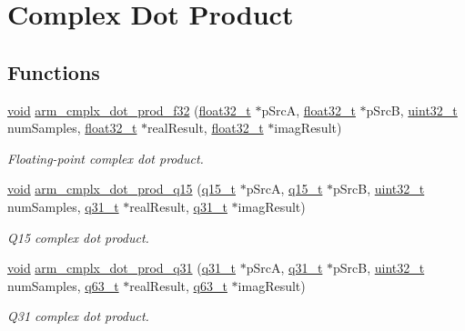 \hypertarget{group__cmplx__dot__prod}{\section{Complex Dot Product}
\label{group__cmplx__dot__prod}
}
\subsection*{Functions}
\begin{DoxyCompactItemize}
\item 
\hyperlink{group___n_a_m_e_ga18028b8badbf1ea7e704ccac3c488e82}{void} \hyperlink{group__cmplx__dot__prod_gadcfaf567a25eb641da4043eafb9bb076}{arm\-\_\-cmplx\-\_\-dot\-\_\-prod\-\_\-f32} (\hyperlink{arm__math_8h_a4611b605e45ab401f02cab15c5e38715}{float32\-\_\-t} $\ast$p\-Src\-A, \hyperlink{arm__math_8h_a4611b605e45ab401f02cab15c5e38715}{float32\-\_\-t} $\ast$p\-Src\-B, \hyperlink{stdint_8h_a435d1572bf3f880d55459d9805097f62}{uint32\-\_\-t} num\-Samples, \hyperlink{arm__math_8h_a4611b605e45ab401f02cab15c5e38715}{float32\-\_\-t} $\ast$real\-Result, \hyperlink{arm__math_8h_a4611b605e45ab401f02cab15c5e38715}{float32\-\_\-t} $\ast$imag\-Result)
\begin{DoxyCompactList}\small\item\em Floating-\/point complex dot product. \end{DoxyCompactList}\item 
\hyperlink{group___n_a_m_e_ga18028b8badbf1ea7e704ccac3c488e82}{void} \hyperlink{group__cmplx__dot__prod_ga2b08b5e8001d2c15204639d00893fc70}{arm\-\_\-cmplx\-\_\-dot\-\_\-prod\-\_\-q15} (\hyperlink{arm__math_8h_ab5a8fb21a5b3b983d5f54f31614052ea}{q15\-\_\-t} $\ast$p\-Src\-A, \hyperlink{arm__math_8h_ab5a8fb21a5b3b983d5f54f31614052ea}{q15\-\_\-t} $\ast$p\-Src\-B, \hyperlink{stdint_8h_a435d1572bf3f880d55459d9805097f62}{uint32\-\_\-t} num\-Samples, \hyperlink{arm__math_8h_adc89a3547f5324b7b3b95adec3806bc0}{q31\-\_\-t} $\ast$real\-Result, \hyperlink{arm__math_8h_adc89a3547f5324b7b3b95adec3806bc0}{q31\-\_\-t} $\ast$imag\-Result)
\begin{DoxyCompactList}\small\item\em Q15 complex dot product. \end{DoxyCompactList}\item 
\hyperlink{group___n_a_m_e_ga18028b8badbf1ea7e704ccac3c488e82}{void} \hyperlink{group__cmplx__dot__prod_ga5b731a59db062a9ad84562ef68a6c8af}{arm\-\_\-cmplx\-\_\-dot\-\_\-prod\-\_\-q31} (\hyperlink{arm__math_8h_adc89a3547f5324b7b3b95adec3806bc0}{q31\-\_\-t} $\ast$p\-Src\-A, \hyperlink{arm__math_8h_adc89a3547f5324b7b3b95adec3806bc0}{q31\-\_\-t} $\ast$p\-Src\-B, \hyperlink{stdint_8h_a435d1572bf3f880d55459d9805097f62}{uint32\-\_\-t} num\-Samples, \hyperlink{arm__math_8h_a5aea1cb12fc02d9d44c8abf217eaa5c6}{q63\-\_\-t} $\ast$real\-Result, \hyperlink{arm__math_8h_a5aea1cb12fc02d9d44c8abf217eaa5c6}{q63\-\_\-t} $\ast$imag\-Result)
\begin{DoxyCompactList}\small\item\em Q31 complex dot product. \end{DoxyCompactList}\end{DoxyCompactItemize}


